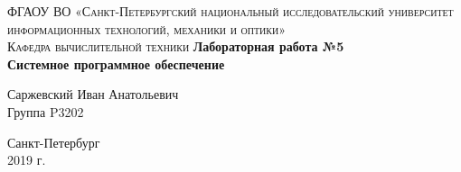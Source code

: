 \begin{titlepage}
\begin{center}

\textsc{ФГАОУ ВО «Санкт-Петербургский национальный исследовательский университет информационных технологий, механики и оптики»\\[4mm]
Кафедра вычислительной техники}
\vfill
\textbf{Лабораторная работа №5\\[4mm]
Системное программное обеспечение\\[16mm]
}
\begin{flushright}
Саржевский Иван Анатольевич
\\[2mm]Группа P3202
\end{flushright}
\vfill
Санкт-Петербург\\[2mm]
2019 г.

\end{center}
\end{titlepage}
